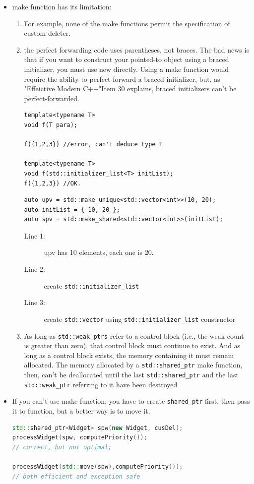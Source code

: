 \documentclass[a4paper,11pt,twoside]{book}
\begin{document}
\begin{itemize}
	\item make function has its limitation:
	\begin{enumerate}
		\item For example, none of the make functions permit the specification of custom deleter.
		
		\item the perfect forwarding code uses parentheses, not braces. The bad news is that if you want to construct your pointed-to object using a braced initializer, you must use new directly. Using a make function would require the ability to perfect-forward a braced initializer, but, as "Effeictive Modern C++"Item 30 explains, braced initializers can't be perfect-forwarded.
\begin{lstlisting}
template<typename T>
void f(T para);

f({1,2,3}) //error, can't deduce type T

template<typename T>
void f(std::initializer_list<T> initList);
f({1,2,3}) //OK.
\end{lstlisting}

\begin{lstlisting}
auto upv = std::make_unique<std::vector<int>>(10, 20);
auto initList = { 10, 20 };
auto spv = std::make_shared<std::vector<int>>(initList);
\end{lstlisting}
\begin{description}
	\item[Line 1:] upv has 10 elements, each one is 20.
	\item[Line 2:] create \texttt{std::initializer\_list}
	\item[Line 3:] create \texttt{std::vector} using \texttt{std::initializer\_list} constructor
\end{description}
		
		\item As long as \texttt{std::weak\_ptrs} refer to a control block (i.e., the weak count is greater than zero), that control block must continue to exist. And as long as a control block exists, the memory containing it must remain allocated. The memory allocated by a \texttt{std::shared\_ptr} make function, then, can't be deallocated until the last \texttt{std::shared\_ptr} and the last \texttt{std::weak\_ptr} referring to it have been destroyed
	\end{enumerate}
	
	\item If you can't use make function, you have to create \texttt{shared\_ptr} first, then pass it to function, but a better way is to move it.
\begin{lstlisting}[frame=single, language=c++]
std::shared_ptr<Widget> spw(new Widget, cusDel);
processWidget(spw, computePriority()); 
// correct, but not optimal; 

processWidget(std::move(spw),computePriority());  
// both efficient and exception safe
\end{lstlisting}
	
\end{itemize}
\end{document}
